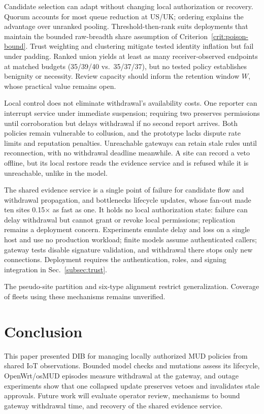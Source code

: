 \documentclass[journal]{IEEEtran}
\theoremstyle{definition}
\begin{document}
Candidate selection can adapt without changing local authorization or recovery. Quorum accounts for most queue reduction at US/UK; ordering explains the advantage over unranked pooling. Threshold-then-rank suits deployments that maintain the bounded raw-breadth share assumption of Criterion~\ref{crit:poison-bound}. Trust weighting and clustering mitigate tested identity inflation but fail under padding. Ranked union yields at least as many receiver-observed endpoints at matched budgets (35/39/40 vs.\ 35/37/37), but no tested policy establishes benignity or necessity. Review capacity should inform the retention window $W$, whose practical value remains open.

Local control does not eliminate withdrawal's availability costs. One reporter can interrupt service under immediate suspension; requiring two preserves permissions until corroboration but delays withdrawal if no second report arrives. Both policies remain vulnerable to collusion, and the prototype lacks dispute rate limits and reputation penalties. Unreachable gateways can retain stale rules until reconnection, with no withdrawal deadline meanwhile. A site can record a veto offline, but its local restore reads the evidence service and is refused while it is unreachable, unlike in the model.


The shared evidence service is a single point of failure for candidate flow and withdrawal propagation, and bottlenecks lifecycle updates, whose fan-out made ten sites 0.15$\times$ as fast as one. It holds no local authorization state: failure can delay withdrawal but cannot grant or revoke local permissions; replication remains a deployment concern. Experiments emulate delay and loss on a single host and use no production workload; finite models assume authenticated callers; gateway tests disable signature validation, and withdrawal there stops only new connections. Deployment requires the authentication, roles, and signing integration in Sec.~\ref{subsec:trust}.

The pseudo-site partition and six-type alignment restrict generalization. Coverage of fleets using these mechanisms remains unverified.


\section{Conclusion}
\label{sec:conclusion}
This paper presented DIB for managing locally authorized MUD policies from shared IoT observations. Bounded model checks and mutations assess its lifecycle, OpenWrt/osMUD episodes measure withdrawal at the gateway, and outage experiments show that one collapsed update preserves vetoes and invalidates stale approvals. Future work will evaluate operator review, mechanisms to bound gateway withdrawal time, and recovery of the shared evidence service.
\end{document}
